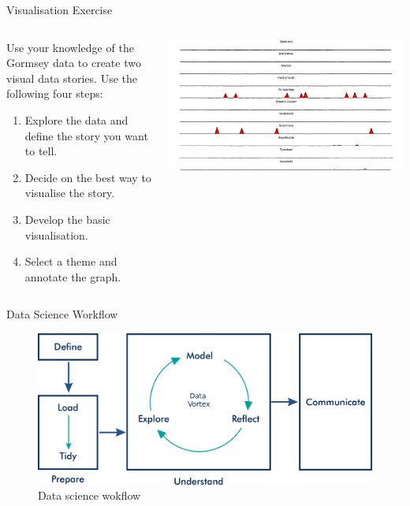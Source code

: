 \documentclass[
  ignorenonframetext,
]{beamer}
\providecommand{\tightlist}{%
  \setlength{\itemsep}{0pt}\setlength{\parskip}{0pt}}
\begin{document}
\begin{frame}{Visualisation Exercise}
\protect\hypertarget{visualisation-exercise}{}
\begin{columns}[T]
\begin{column}{0.48\textwidth}
Use your knowledge of the Gormsey data to create two visual data
stories. Use the following four steps:

\begin{enumerate}
\tightlist
\item
  Explore the data and define the story you want to tell.
\item
  Decide on the best way to visualise the story.
\item
  Develop the basic visualisation.
\item
  Select a theme and annotate the graph.
\end{enumerate}
\end{column}

\begin{column}{0.48\textwidth}
\includegraphics{../manuscript/resources/06_visualisation/sparklets.png}
\end{column}
\end{columns}
\end{frame}

\begin{frame}{Data Science Workflow}
\protect\hypertarget{data-science-workflow}{}
\begin{figure}
\centering
\includegraphics{../manuscript/resources/07_data_products/workflow.png}
\caption{Data science wokflow}
\end{figure}
\end{frame}
\end{document}
